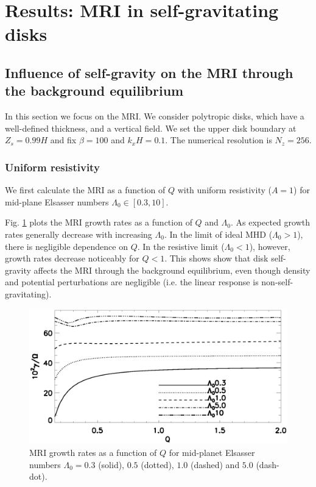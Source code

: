 \section{Results: MRI in self-gravitating disks}

\subsection{Influence of self-gravity on the MRI through the
  background equilibrium}
 
In this section we focus on the MRI. We consider polytropic disks,
which have a well-defined thickness, and a vertical field. 
We set the upper disk boundary at $Z_s=0.99H$ and fix $\beta=100$ and
$k_xH=0.1$. The numerical resolution is $N_z=256$.  


\subsubsection{Uniform
  resistivity}  
We first calculate the MRI as a function of $Q$ with uniform
resistivity ($A=1$) for mid-plane Elsasser numbers $\Lambda_0\in[0.3,10]$.    

Fig. \ref{compare_growth_poly_uniresis} plots the MRI growth rates as
a function of $Q$ and $\Lambda_0$. As expected growth rates generally
decrease with increasing $\Lambda_0$. In the limit of ideal MHD ($\Lambda_0>1$), 
there is negligible dependence on $Q$. In the resistive limit
($\Lambda_0<1$), however, growth rates decrease noticeably for $Q<1$. This shows
show that disk self-gravity affects the MRI through the background
equilibrium, even though density and potential perturbations are  
negligible (i.e. the linear response is
non-self-gravitating).    
 
\begin{figure}
  \includegraphics[width=\linewidth]{figures/compare_growth_poly_uniresis2}
  \caption{MRI growth rates as a function of $Q$ for mid-planet
    Elsasser numbers $\Lambda_0=0.3$ (solid), $0.5$ (dotted), $1.0$
    (dashed) and $5.0$ (dash-dot).  
    \label{compare_growth_poly_uniresis}}
\end{figure}

